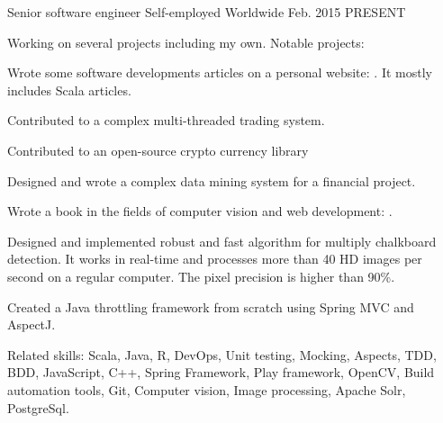 

\begin{cventries}

  \cventry
    {Senior software engineer} %
    {Self-employed} %
    {Worldwide} %
    {Feb. 2015 \textemdash{} PRESENT} %
    {    
    Working on several projects including my own. Notable projects:
      \begin{cvitems}
      \item{Wrote some software developments articles on a personal website: . It mostly includes Scala articles.}
      \item{Contributed to a complex multi-threaded trading system.}
      \item{Contributed to an open-source crypto currency library }
      \item{Designed and wrote a complex data mining system for a financial project.}
      \item{Wrote a book in the fields of computer vision and web development: .}
      \item{Designed and implemented robust and fast algorithm for multiply chalkboard detection. It works in real-time and processes more than 40 HD images per second on a regular computer. The pixel precision is higher than 90\%.}
      \item{Created a Java throttling framework from scratch using Spring MVC and AspectJ.}
      \end{cvitems}
      Related skills: Scala, Java, R, DevOps, Unit testing, Mocking, Aspects, TDD, BDD, JavaScript, C++, Spring Framework, Play framework, OpenCV, Build automation tools, Git, Computer vision, Image processing, Apache Solr, PostgreSql.
    }
    

\end{cventries}

